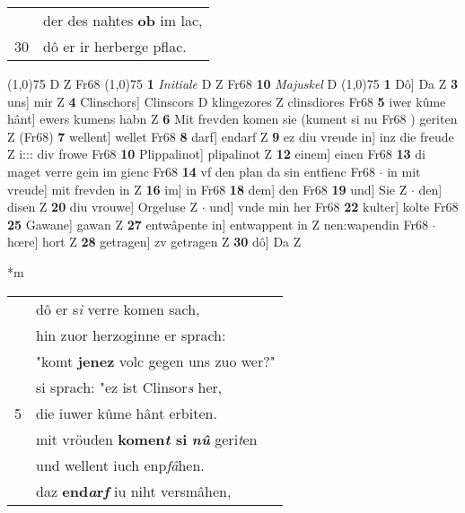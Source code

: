 \documentclass[8pt,a4paper,notitlepage]{article}
\begin{document}
\begin{table}[ht]
\begin{minipage}[t]{0.5\linewidth}
\begin{tabular}{rl}
 & der des nahtes \textbf{ob} im lac,\\ 
30 & dô er ir herberge pflac.\\ 
\end{tabular}
\scriptsize
\line(1,0){75} \newline
D Z Fr68 \newline
\line(1,0){75} \newline
\textbf{1} \textit{Initiale} D Z Fr68  \textbf{10} \textit{Majuskel} D  \newline
\line(1,0){75} \newline
\textbf{1} Dô] Da Z \textbf{3} uns] mir Z \textbf{4} Clinschors] Clinscors D klingezores Z clinsdiores Fr68 \textbf{5} iwer kûme hânt] ewers kumens habn Z \textbf{6} Mit frevden komen sie (kument si nu Fr68 ) geriten Z (Fr68) \textbf{7} wellent] wellet Fr68 \textbf{8} darf] endarf Z \textbf{9} ez diu vreude in] inz die freude Z i::: div frowe Fr68 \textbf{10} Plippalinot] plipalinot Z \textbf{12} einem] einen Fr68 \textbf{13} di maget verre gein im gienc Fr68 \textbf{14} vf den plan da sin entfienc Fr68  $\cdot$ in mit vreude] mit frevden in Z \textbf{16} im] in Fr68 \textbf{18} dem] den Fr68 \textbf{19} und] Sie Z  $\cdot$ den] disen Z \textbf{20} diu vrouwe] Orgeluse Z  $\cdot$ und] vnde min her Fr68 \textbf{22} kulter] kolte Fr68 \textbf{25} Gawane] gawan Z \textbf{27} entwâpente in] entwappent in Z nen:wapendin Fr68  $\cdot$ hœre] hort Z \textbf{28} getragen] zv getragen Z \textbf{30} dô] Da Z \newline
\end{minipage}
\hspace{0.5cm}
\begin{minipage}[t]{0.5\linewidth}
\small
\begin{center}*m
\end{center}
\begin{tabular}{rl}
 & dô er s\textit{i} verre komen sach,\\ 
 & hin zuor herzoginne er sprach:\\ 
 & "komt \textbf{jenez} volc gegen uns zuo wer?"\\ 
 & si sprach: "ez ist Clinsor\textit{s} her,\\ 
5 & die iuwer kûme hânt erbiten.\\ 
 & mit vröuden \textbf{komen\textit{t} si} \textit{\textbf{nû}} geri\textit{t}en\\ 
 & und wellent iuch enp\textit{fâ}hen.\\ 
 & daz \textbf{en}\textbf{d\textit{a}r\textit{f}} iu niht versmâhen,\\ 

\end{tabular}
\end{minipage}
\end{table}
\end{document}
